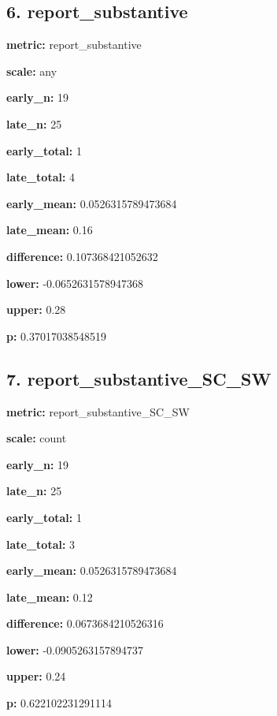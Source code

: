 \documentclass[10pt,a4paper]{article}
\begin{document}
\subsection*{6.\allowbreak{} report\_\allowbreak{}substantive}
\textbf{metric:} report\_\allowbreak{}substantive\par
\textbf{scale:} any\par
\textbf{early\_\allowbreak{}n:} 19\par
\textbf{late\_\allowbreak{}n:} 25\par
\textbf{early\_\allowbreak{}total:} 1\par
\textbf{late\_\allowbreak{}total:} 4\par
\textbf{early\_\allowbreak{}mean:} 0.\allowbreak{}0526315789473684\par
\textbf{late\_\allowbreak{}mean:} 0.\allowbreak{}16\par
\textbf{difference:} 0.\allowbreak{}107368421052632\par
\textbf{lower:} -\allowbreak{}0.\allowbreak{}0652631578947368\par
\textbf{upper:} 0.\allowbreak{}28\par
\textbf{p:} 0.\allowbreak{}37017038548519\par
\subsection*{7.\allowbreak{} report\_\allowbreak{}substantive\_\allowbreak{}SC\_\allowbreak{}SW}
\textbf{metric:} report\_\allowbreak{}substantive\_\allowbreak{}SC\_\allowbreak{}SW\par
\textbf{scale:} count\par
\textbf{early\_\allowbreak{}n:} 19\par
\textbf{late\_\allowbreak{}n:} 25\par
\textbf{early\_\allowbreak{}total:} 1\par
\textbf{late\_\allowbreak{}total:} 3\par
\textbf{early\_\allowbreak{}mean:} 0.\allowbreak{}0526315789473684\par
\textbf{late\_\allowbreak{}mean:} 0.\allowbreak{}12\par
\textbf{difference:} 0.\allowbreak{}0673684210526316\par
\textbf{lower:} -\allowbreak{}0.\allowbreak{}0905263157894737\par
\textbf{upper:} 0.\allowbreak{}24\par
\textbf{p:} 0.\allowbreak{}622102231291114\par
\end{document}

